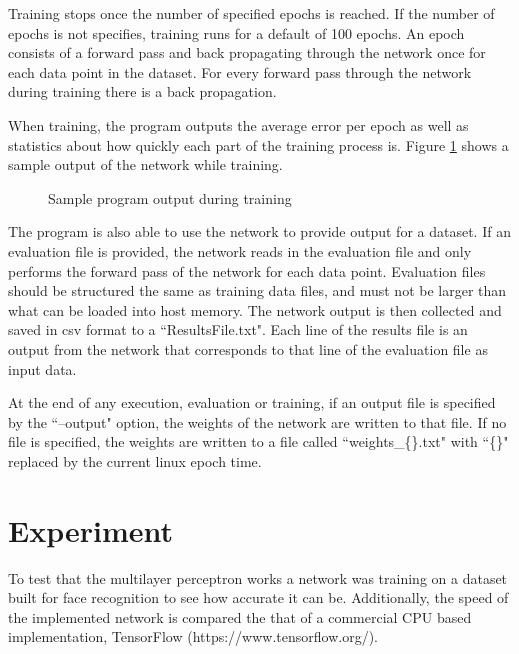 \documentclass[jair, twoside,11pt,theapa]{article}
\begin{document}
Training stops once the number of specified epochs is reached. 
If the number of epochs is not specifies, training runs for a default of 100 epochs. 
An epoch consists of a forward pass and back propagating through the network once for each data point in the dataset. 
For every forward pass through the network during training there is a back propagation. 

When training, the program outputs the average error per epoch as well as statistics about how quickly each part of the training process is. 
Figure \ref{TrainingOutput} shows a sample output of the network while training. 

\begin{figure}[h]
    \centering
    \caption{Sample program output during training}
    \label{TrainingOutput}
\end{figure}

The program is also able to use the network to provide output for a dataset. 
If an evaluation file is provided, the network reads in the evaluation file and only performs the forward pass of the network for each data point. 
Evaluation files should be structured the same as training data files, and must not be larger than what can be loaded into host memory. 
The network output is then collected and saved in csv format to a ``ResultsFile.txt". 
Each line of the results file is an output from the network that corresponds to that line of the evaluation file as input data. 

At the end of any execution, evaluation or training, if an output file is specified by the ``--output" option, the weights of the network are written to that file. 
If no file is specified, the weights are written to a file called ``weights\_\{\}.txt" with ``\{\}" replaced by the current linux epoch time. 

\section{Experiment}
\label{Experiment}
To test that the multilayer perceptron works a network was training on a dataset built for face recognition to see how accurate it can be. 
Additionally, the speed of the implemented network is compared the that of a commercial CPU based implementation, TensorFlow (https://www.tensorflow.org/). 
\end{document}
